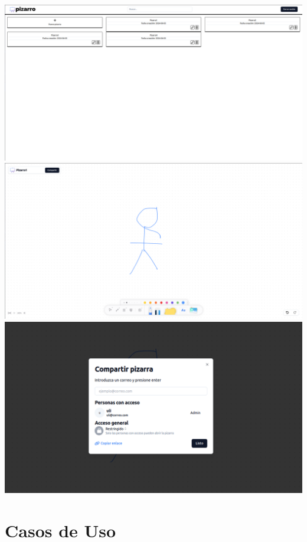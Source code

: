 \documentclass[a4paper, oneside, final]{scrartcl}
\begin{document}
\includegraphics[width= \textwidth]{images/mock1.png} \\
\includegraphics[width= \textwidth]{images/mock2.png}
\includegraphics[width= \textwidth]{images/Mock.png}


\clearpage

\section{Casos de Uso}
\end{document}
